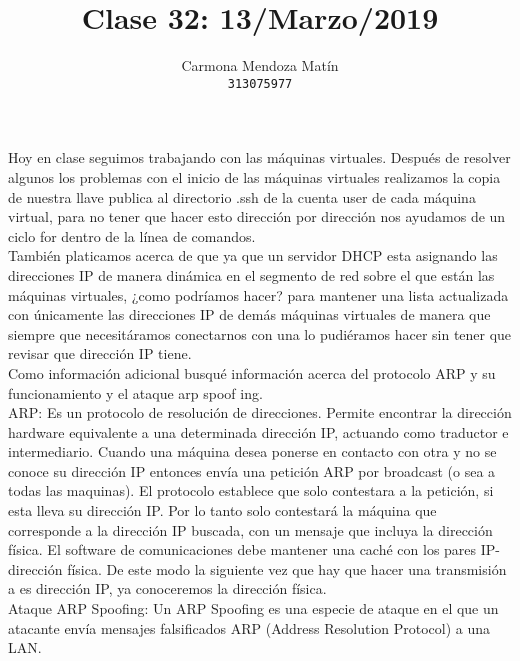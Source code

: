 \documentclass[11pt, a4paper]{report}
\begin{document}
\title{Clase 32: 13/Marzo/2019}
\author{
  Carmona Mendoza Mat\'in\\
  \texttt{313075977}
}
\date{}
\maketitle

Hoy en clase seguimos trabajando con las máquinas virtuales. Después de
resolver algunos los problemas con el inicio de las máquinas virtuales realizamos la copia de nuestra llave publica al directorio \/.ssh de la cuenta user de
cada máquina virtual, para no tener que hacer esto dirección por dirección nos
ayudamos de un ciclo for dentro de la línea de comandos. \\

También platicamos acerca de que ya que un servidor DHCP esta asignando
las direcciones IP de manera dinámica en el segmento de red sobre el que están
las máquinas virtuales, ¿como podríamos hacer? para mantener una lista
actualizada con únicamente las direcciones IP de demás máquinas virtuales de
manera que siempre que necesitáramos conectarnos con una lo pudiéramos hacer sin
tener que revisar que dirección IP tiene. \\

Como información adicional busqué información acerca del protocolo ARP y
su funcionamiento y el ataque arp spoof ing. \\

ARP: Es un protocolo de resolución de direcciones. Permite encontrar la
dirección hardware equivalente a una determinada dirección IP, actuando como
traductor e intermediario. Cuando una máquina desea ponerse en contacto con
otra y no se conoce su dirección IP entonces envía una petición ARP por
broadcast (o sea a todas las maquinas). El protocolo establece que solo
contestara a la petición, si esta lleva su dirección IP. Por lo tanto solo
contestará la máquina
que corresponde a la dirección IP buscada, con un mensaje que incluya la
dirección física. El software de comunicaciones debe mantener una caché con los
pares IP-dirección física. De este modo la siguiente vez que hay que hacer una
transmisión a es dirección IP, ya conoceremos la dirección física. \\

Ataque ARP Spoofing: Un ARP Spoofing es una especie de ataque en el que
un atacante envía mensajes falsificados ARP (Address Resolution Protocol) a
una LAN. \\
\end{document}
